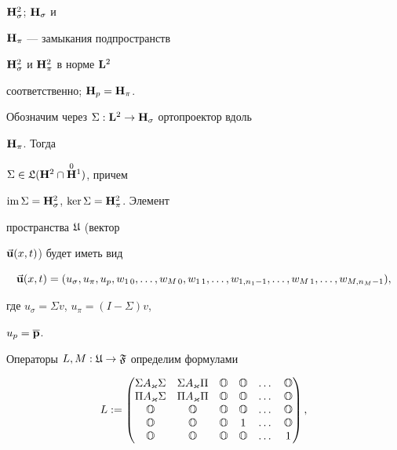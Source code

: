 $\bold H^2_\sigma$; $\bold H_\sigma$ и


$\bold H_\pi$ --- замыкания подпространств


$\bold H^2_\sigma$ и $\bold H^2_\pi$ в норме $\bold L^2$


соответственно; $\bold H_p=\bold H_\pi$.





Обозначим через $\Sigma:\bold L^2\to\bold H_\sigma$ ортопроектор вдоль


$\bold H_\pi$. Тогда


$\Sigma\in\frak L(\bold H^2\cap\overset{0}{\bold H}{}^1)$, причем


$\operatorname{im}\Sigma=\bold H^2_\sigma$, $\ker\Sigma=\bold H^2_\pi$. Элемент


пространства $\frak U$ (вектор


$\Vec{\bold u}(x,t)$) будет иметь вид


$$


\Vec{\bold u}(x,t)=(u_\sigma,u_\pi,u_p,w_{1\,0},\dotsc,


w_{M\,0},w_{1\,1},\dotsc,w_{1,n_1-1},\dotsc,


w_{M\,1},\dotsc,w_{M,n_M-1}),


$$


где $u_\sigma=\Sigma v$, $u_\pi=(I-\Sigma)v$,


$u_p=\overline{\bold p}$.





Операторы $L,M:\frak U\to\frak F$ определим формулами


\begin{equation}


L:=


\begin{pmatrix}


\Sigma A_\varkappa\Sigma & \Sigma A_\varkappa \Pi &


\bo & \bo & \dots & \bo \\


\Pi A_\varkappa\Sigma & \Pi A_\varkappa \Pi &


\bo & \bo & \dots & \bo \\


\bo & \bo & \bo & \bo & \dots & \bo\\


\bo & \bo & \bo & 1 & \dots & \bo\\


\bo & \bo & \bo & \bo & \dots & 1


\end{pmatrix}


,


\end{equation}


